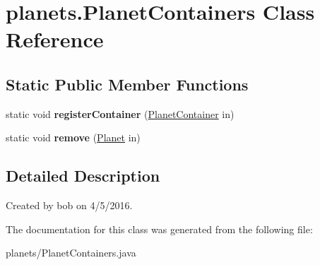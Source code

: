 \hypertarget{classplanets_1_1_planet_containers}{}\section{planets.\+Planet\+Containers Class Reference}
\label{classplanets_1_1_planet_containers}
\subsection*{Static Public Member Functions}
\begin{DoxyCompactItemize}
\item 
static void {\bfseries register\+Container} (\hyperlink{interfaceplanets_1_1_planet_container}{Planet\+Container} in)\hypertarget{classplanets_1_1_planet_containers_a693559ef19f3b70d93ea72bc5e677d62}{}\label{classplanets_1_1_planet_containers_a693559ef19f3b70d93ea72bc5e677d62}

\item 
static void {\bfseries remove} (\hyperlink{classplanets_1_1_planet}{Planet} in)\hypertarget{classplanets_1_1_planet_containers_a87e2de7a9d1febc41644a1f9ab13e345}{}\label{classplanets_1_1_planet_containers_a87e2de7a9d1febc41644a1f9ab13e345}

\end{DoxyCompactItemize}


\subsection{Detailed Description}
Created by bob on 4/5/2016. 

The documentation for this class was generated from the following file\+:\begin{DoxyCompactItemize}
\item 
planets/Planet\+Containers.\+java\end{DoxyCompactItemize}
